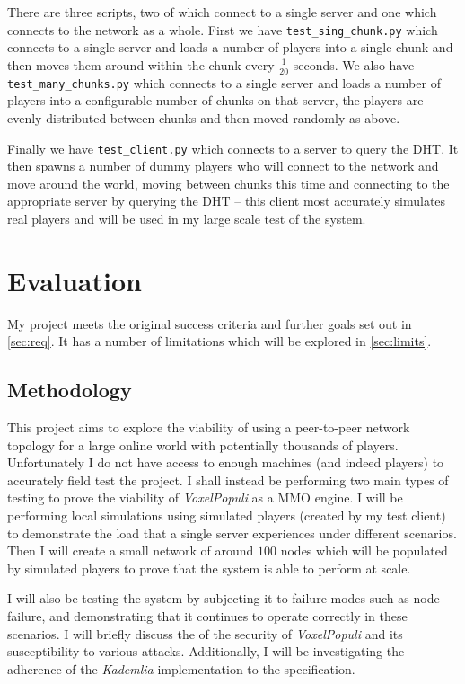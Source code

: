 \documentclass[12pt,notitlepage,a4paper]{report}
\newcommand{\kademlia}{\emph{Kademlia}}
\newcommand{\voxpop}{\emph{VoxelPopuli}}
\begin{document}
	There are three scripts, two of which connect to a single server and one which connects to the network as a whole. First we have {\tt test\_sing\_chunk.py} which connects to a single server and loads a number of players into a single chunk and then moves them around within the chunk every $\frac{1}{20}$ seconds. We also have {\tt test\_many\_chunks.py} which connects to a single server and loads a number of players into a configurable number of chunks on that server, the players are evenly distributed between chunks and then moved randomly as above.
	
	Finally we have {\tt test\_client.py} which connects to a server to query the DHT. It then spawns a number of dummy players who will connect to the network and move around the world, moving between chunks this time and connecting to the appropriate server by querying the DHT -- this client most accurately simulates real players and will be used in my large scale test of the system.
		
	\clearpage
	\chapter{Evaluation}
	My project meets the original success criteria and further goals set out in \cref{sec:req}. It has a number of limitations which will be explored in \cref{sec:limits}.
	
	\section{Methodology}
	This project aims to explore the viability of using a peer-to-peer network topology for a large online world with potentially thousands of players. Unfortunately I do not have access to enough machines (and indeed players) to accurately field test the project. I shall instead be performing two main types of testing to prove the viability of \voxpop{} as a MMO engine. I will be performing local simulations using simulated players (created by my test client) to demonstrate the load that a single server experiences under different scenarios. Then I will create a small network of around $100$ nodes which will be populated by simulated players to prove that the system is able to perform at scale.
	
	I will also be testing the system by subjecting it to failure modes such as node failure, and demonstrating that it continues to operate correctly in these scenarios. I will briefly discuss the of the security of \voxpop{} and its susceptibility to various attacks. Additionally, I will be investigating the adherence of the \kademlia{} implementation to the specification.
	
\end{document}
